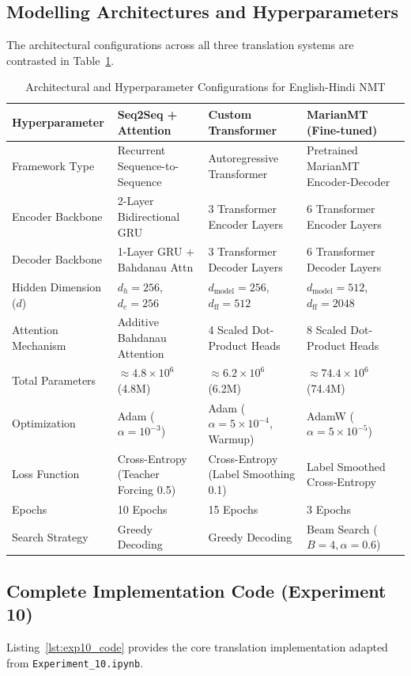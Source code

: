 \subsection{Modelling Architectures and Hyperparameters}
The architectural configurations across all three translation systems are contrasted in Table~\ref{tab:exp10_architectures}.

\begin{table}[H]
\centering
\caption{Architectural and Hyperparameter Configurations for English-Hindi NMT}
\label{tab:exp10_architectures}
\begin{tabularx}{\textwidth}{lXXX}
\toprule
\textbf{Hyperparameter} & \textbf{Seq2Seq + Attention} & \textbf{Custom Transformer} & \textbf{MarianMT (Fine-tuned)} \\
\midrule
Framework Type & Recurrent Sequence-to-Sequence & Autoregressive Transformer & Pretrained MarianMT Encoder-Decoder \\
Encoder Backbone & 2-Layer Bidirectional GRU & 3 Transformer Encoder Layers & 6 Transformer Encoder Layers \\
Decoder Backbone & 1-Layer GRU + Bahdanau Attn & 3 Transformer Decoder Layers & 6 Transformer Decoder Layers \\
Hidden Dimension ($d$) & $d_h = 256$, $d_e = 256$ & $d_{\text{model}} = 256$, $d_{\text{ff}} = 512$ & $d_{\text{model}} = 512$, $d_{\text{ff}} = 2048$ \\
Attention Mechanism & Additive Bahdanau Attention & 4 Scaled Dot-Product Heads & 8 Scaled Dot-Product Heads \\
Total Parameters & $\approx 4.8 \times 10^6$ (4.8M) & $\approx 6.2 \times 10^6$ (6.2M) & $\approx 74.4 \times 10^6$ (74.4M) \\
Optimization & Adam ($\alpha = 10^{-3}$) & Adam ($\alpha = 5\times 10^{-4}$, Warmup) & AdamW ($\alpha = 5\times 10^{-5}$) \\
Loss Function & Cross-Entropy (Teacher Forcing 0.5) & Cross-Entropy (Label Smoothing 0.1) & Label Smoothed Cross-Entropy \\
Epochs & 10 Epochs & 15 Epochs & 3 Epochs \\
Search Strategy & Greedy Decoding & Greedy Decoding & Beam Search ($B=4, \alpha=0.6$) \\
\bottomrule
\end{tabularx}
\end{table}

\subsection{Complete Implementation Code (Experiment 10)}
Listing~\ref{lst:exp10_code} provides the core translation implementation adapted from \texttt{Experiment\_10.ipynb}.


